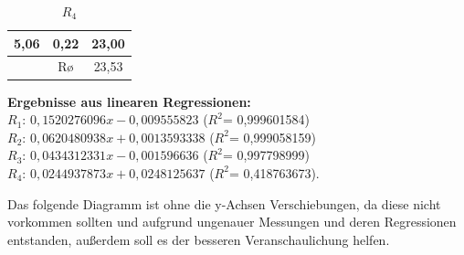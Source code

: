 \documentclass[10pt]{article}
\begin{document}
\begin{table}[!htb]
\begin{minipage}[t]{.25\linewidth}
{\begin{tabular}{@{}ccc@{}}
        5,06 & 0,22 & 23,00\\
    \midrule
             & Rø   & 23,53\\
    \bottomrule
    \end{tabular}%
 }%
\end{minipage}%
\hfill%
\begin{minipage}[t]{.25\linewidth}
\centering
  \caption{$R_4$}
  \label{tab:fourth_table}
\end{minipage} 
\end{table}


\textbf{Ergebnisse aus linearen Regressionen:}\\
$R_1$: $0,1520276096x - 0,009555823$    ($R^2$= 0,999601584)\\
$R_2$: $0,0620480938x + 0,0013593338$   ($R^2$= 0,999058159)\\
$R_3$: $0,0434312331x - 0,001596636$    ($R^2$= 0,997798999)\\
$R_4$: $0,0244937873x + 0,0248125637$   ($R^2$= 0,418763673).\\


\begin{center}
    
\end{center}

Das folgende Diagramm ist ohne die y-Achsen Verschiebungen, da diese nicht vorkommen sollten und aufgrund ungenauer Messungen und deren Regressionen entstanden, außerdem soll es der besseren Veranschaulichung helfen.

\begin{center}
    
\end{center}




\end{document}
